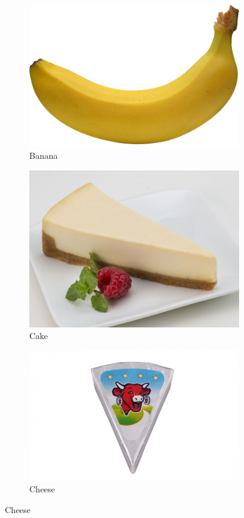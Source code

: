 \documentclass[a4paper,doc,natbib]{apa6}
\begin{document}
\begin{figure}[h!]
\begin{subfigure}[b]{0.32\textwidth}
 \caption{Banana}
\includegraphics[width=0.95\linewidth]{Images/banana.png}
 \end{subfigure}
 \begin{subfigure}[b]{0.32\textwidth}
 \caption{Cake}
\includegraphics[width=0.95\linewidth]{Images/cake.jpg}
 \end{subfigure}
 \begin{subfigure}[b]{0.32\textwidth}
 \caption{Cheese}
\includegraphics[width=0.95\linewidth]{Images/cheese.jpg}

\end{subfigure}
\end{figure}
\end{document}
